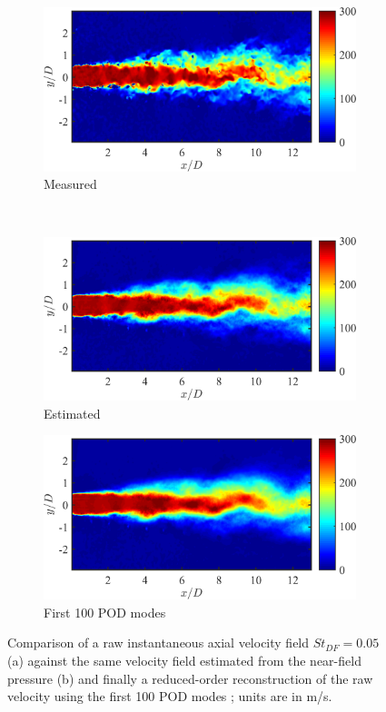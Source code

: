 \begin{figure}
	\centering
	\begin{subfigure}{0.75\textwidth}
		\centering
		\includegraphics[width=0.95\linewidth]{Figures/ch4_Ux_true.png}
		\caption{Measured}
	\end{subfigure}\\
	\begin{subfigure}{0.75\textwidth}
		\centering
		\includegraphics[width=0.95\linewidth]{Figures/ch4_Ux_estimated.png}
		\caption{Estimated}
	\end{subfigure}
	\begin{subfigure}{0.75\textwidth}
		\centering
		\includegraphics[width=0.95\linewidth]{Figures/ch4_Ux_POD100.png}
		\caption{First 100 POD modes}
	\end{subfigure}
	\caption{Comparison of a raw instantaneous axial velocity field $St_{DF} =0.05$ (a) against the same velocity field estimated from the near-field pressure (b) and finally a reduced-order reconstruction of the raw velocity using the first 100 POD modes ; units are in m/s.}
	\label{fig:ch4_SEPOD_filtering}
\end{figure}

